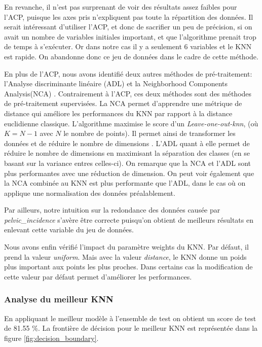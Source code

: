 \documentclass[twocolumn,10pt]{article}
\begin{document}
En revanche, il n'est pas surprenant de voir des résultats assez faibles pour l'ACP, puisque les axes pris n'expliquent pas toute la répartition des données. Il serait intéressant d'utiliser l'ACP, et donc de sacrifier un peu de précision, si on avait un nombre de variables initiales important, et que l'algorithme prenait trop de temps à s'exécuter.
Or dans notre cas il y a seulement 6 variables et le KNN est rapide. On abandonne donc ce jeu de données dans le cadre de cette méthode.

En plus de l'ACP, nous avons identifié deux autres méthodes de pré-traitement: l'Analyse discriminante linéaire (ADL) et la Neighborhood Components Analysis(NCA) \cite{scikit-learn-Dimensionality-Reduction}. Contrairement à l'ACP, ces deux méthodes sont des méthodes de pré-traitement supervisées. La NCA permet d'apprendre une métrique de distance qui améliore les performances du KNN par rapport à la distance euclidienne classique. L'algorithme maximise le score d'un \textit{Leave-one-out-knn}, (où $K=N-1$ avec $N$ le nombre de points). Il permet ainsi de transformer les données et de réduire le nombre de dimensions \cite{scikit-learn-neighborhood-components-analysis}. L'ADL quant à elle permet de réduire le nombre de dimensions en maximisant la séparation des classes (en se basant sur la variance entres celles-ci). On remarque que la NCA et l'ADL sont plus performantes avec une réduction de dimension. On peut voir également que la NCA combinée au KNN est plus performante que l'ADL, dans le cas où on applique une normalisation des données préalablement. 

Par ailleurs, notre intuition sur la redondance des données causée par \textit{pelvic\_incidence} s'avère être correcte puisqu'on obtient de meilleurs résultats en enlevant cette variable du jeu de données.

Nous avons enfin vérifié l'impact du paramètre weights du KNN. Par défaut, il prend la valeur \textit{uniform}. Mais avec la valeur \textit{distance}, le KNN donne un poids plus important aux points les plus proches. Dans certains cas la modification de cette valeur par défaut permet d'améliorer les performances.

\subsubsection{Analyse du meilleur KNN}

En appliquant le meilleur modèle à l'ensemble de test on obtient un score de test de 81.55 \%. La frontière de décision pour le meilleur KNN est représentée dans la figure \ref{fig:decision_boundary}.
\end{document}
